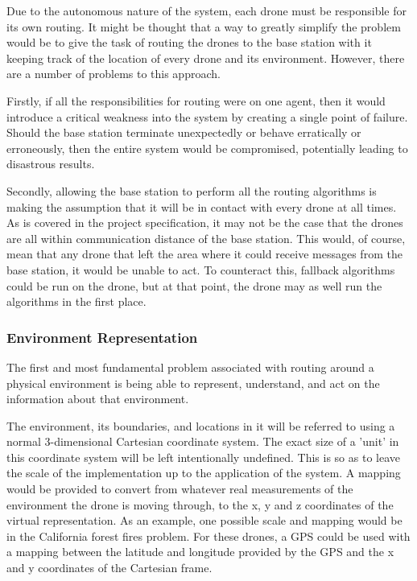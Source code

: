 Due to the autonomous nature of the system, each drone must be responsible for its own routing. It might be thought that a way to greatly simplify the problem would be to give the task of routing the drones to the base station with it keeping track of the location of every drone and its environment. However, there are a number of problems to this approach.

Firstly, if all the responsibilities for routing were on one agent, then it would introduce a critical weakness into the system by creating a single point of failure. Should the base station terminate unexpectedly or behave erratically or erroneously, then the entire system would be compromised, potentially leading to disastrous results.

Secondly, allowing the base station to perform all the routing algorithms is making the assumption that it will be in contact with every drone at all times. As is covered in the project specification, it may not be the case that the drones are all within communication distance of the base station. This would, of course, mean that any drone that left the area where it could receive messages from the base station, it would be unable to act. To counteract this, fallback algorithms could be run on the drone, but at that point, the drone may as well run the algorithms in the first place.

\subsubsection{Environment Representation}
		
The first and most fundamental problem associated with routing around a physical environment is being able to represent, understand, and act on the information about that environment.

The environment, its boundaries, and locations in it will be referred to using a normal 3-dimensional Cartesian coordinate system. The exact size of a 'unit' in this coordinate system will be left intentionally undefined. This is so as to leave the scale of the implementation up to the application of the system. A mapping would be provided to convert from whatever real measurements of the environment the drone is moving through, to the x, y and z coordinates of the virtual representation. As an example, one possible scale and mapping would be in the California forest fires problem. For these drones, a GPS could be used with a mapping between the latitude and longitude provided by the GPS and the x and y coordinates of the Cartesian frame.


